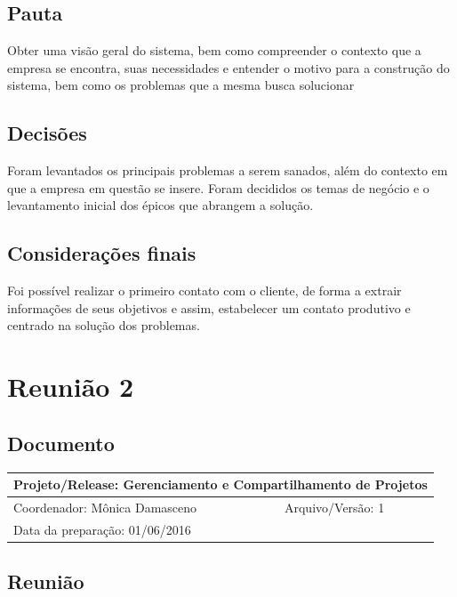 \begin{apendicesenv}
\subsection{Pauta}
Obter uma visão geral do sistema, bem como compreender o contexto que a empresa se encontra, suas necessidades e entender o motivo para a construção do sistema, bem como os problemas que a mesma busca solucionar

\subsection{Decisões}
Foram levantados os principais problemas a serem sanados, além do contexto em que a empresa em questão se insere. Foram decididos os temas de negócio e o levantamento inicial dos épicos que abrangem a solução.

\subsection{Considerações finais}

Foi possível realizar o primeiro contato com o cliente, de forma a extrair informações de seus objetivos e assim, estabelecer um contato produtivo e centrado na solução dos problemas.

\section{Reunião 2}

\subsection{Documento}

\FloatBarrier
\begin{table}[!htpd]
\centering
\label{my-label}
\begin{tabular}{|l|l|}
\hline
\multicolumn{2}{|l|}{Projeto/Release: Gerenciamento e Compartilhamento de Projetos} \\ \hline
Coordenador: Mônica Damasceno                  & Arquivo/Versão: 1                  \\ \hline
\multicolumn{2}{|l|}{Data da preparação: 01/06/2016}                                \\ \hline
\end{tabular}
\end{table}
\FloatBarrier

\subsection{Reunião}


\end{apendicesenv}
